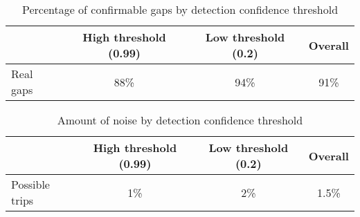 \begin{table}[h]
    \caption{Percentage of confirmable gaps by detection confidence threshold}
    \centering
    \label{table:conf_comparison}
    \begin{tabular}{@{}lccc@{}}
        \toprule
                       & High threshold (0.99) & Low threshold (0.2)  & Overall \\ \midrule
        Real gaps      & 88\%                & 94\%                  & 91\%    
    \end{tabular}
\end{table}















\begin{table}[h]
    \caption{Amount of noise by detection confidence threshold}
    \centering
    \label{table:conf_comparison}
    \begin{tabular}{@{}lccc@{}}
        \toprule
                       & High threshold (0.99) & Low threshold (0.2) & Overall \\ \midrule
        Possible trips & 1\%                   & 2\%                 & 1.5\%  
    \end{tabular}
\end{table}

